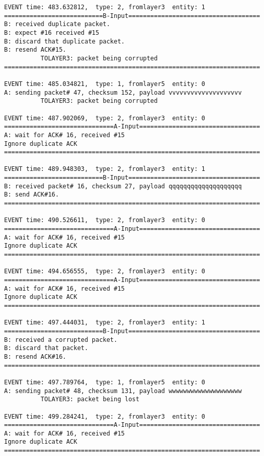 \documentclass[12pt]{article}
\begin{document}
\begin{verbatim}
EVENT time: 483.632812,  type: 2, fromlayer3  entity: 1
===========================B-Input====================================
B: received duplicate packet.
B: expect #16 received #15
B: discard that duplicate packet.
B: resend ACK#15.
          TOLAYER3: packet being corrupted
======================================================================

EVENT time: 485.034821,  type: 1, fromlayer5  entity: 0
A: sending packet# 47, checksum 152, payload vvvvvvvvvvvvvvvvvvvv
          TOLAYER3: packet being corrupted

EVENT time: 487.902069,  type: 2, fromlayer3  entity: 0
==============================A-Input=================================
A: wait for ACK# 16, received #15
Ignore duplicate ACK
======================================================================

EVENT time: 489.948303,  type: 2, fromlayer3  entity: 1
===========================B-Input====================================
B: received packet# 16, checksum 27, payload qqqqqqqqqqqqqqqqqqqq
B: send ACK#16.
======================================================================

EVENT time: 490.526611,  type: 2, fromlayer3  entity: 0
==============================A-Input=================================
A: wait for ACK# 16, received #15
Ignore duplicate ACK
======================================================================

EVENT time: 494.656555,  type: 2, fromlayer3  entity: 0
==============================A-Input=================================
A: wait for ACK# 16, received #15
Ignore duplicate ACK
======================================================================

EVENT time: 497.444031,  type: 2, fromlayer3  entity: 1
===========================B-Input====================================
B: received a corrupted packet.
B: discard that packet.
B: resend ACK#16.
======================================================================

EVENT time: 497.789764,  type: 1, fromlayer5  entity: 0
A: sending packet# 48, checksum 131, payload wwwwwwwwwwwwwwwwwwww
          TOLAYER3: packet being lost

EVENT time: 499.284241,  type: 2, fromlayer3  entity: 0
==============================A-Input=================================
A: wait for ACK# 16, received #15
Ignore duplicate ACK
======================================================================


\end{verbatim}
\end{document}
